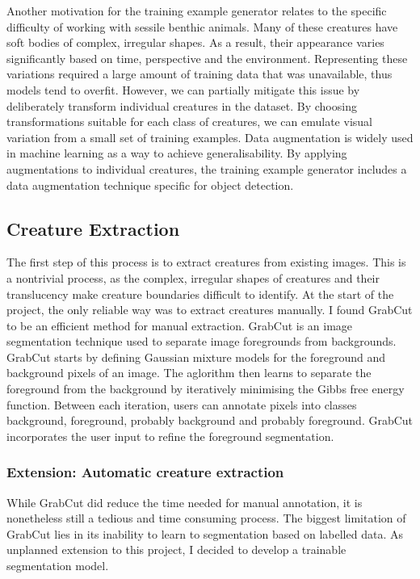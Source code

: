 \documentclass[12pt,a4paper,twoside,openany]{report}
\begin{document}
Another motivation for the training example generator relates to the specific difficulty of working with sessile benthic animals. Many of these creatures have soft bodies of complex, irregular shapes. As a result, their appearance varies significantly based on time, perspective and the environment. Representing these variations required a large amount of training data that was unavailable, thus models tend to overfit. However, we can partially mitigate this issue by deliberately transform individual creatures in the dataset. By choosing transformations suitable for each class of creatures, we can emulate visual variation from a small set of training examples. Data augmentation is widely used in machine learning as a way to achieve generalisability. By applying augmentations to individual creatures, the training example generator includes a data augmentation technique specific for object detection. 


\subsection{Creature Extraction}
The first step of this process is to extract creatures from existing images.
This is a nontrivial process, as the complex, irregular shapes of creatures and their translucency make creature boundaries difficult to identify.
At the start of the project, the only reliable way was to extract creatures manually. 
I found GrabCut \cite{rother_grabcut_nodate} to be an efficient method for manual extraction. GrabCut is an image segmentation technique used to separate image foregrounds from backgrounds. GrabCut starts by defining Gaussian mixture models for the foreground and background pixels of an image. The aglorithm then learns to separate the foreground from the background by iteratively minimising the Gibbs free energy function. Between each iteration, users can annotate pixels into classes background, foreground, probably background and probably foreground. GrabCut incorporates the user input to refine the foreground segmentation. 

\subsubsection{Extension: Automatic creature extraction}
While GrabCut did reduce the time needed for manual annotation, it is nonetheless still a tedious and time consuming process. The biggest limitation of GrabCut lies in its inability to learn to segmentation based on labelled data. As unplanned extension to this project, I decided to develop a trainable segmentation model. 
\end{document}
